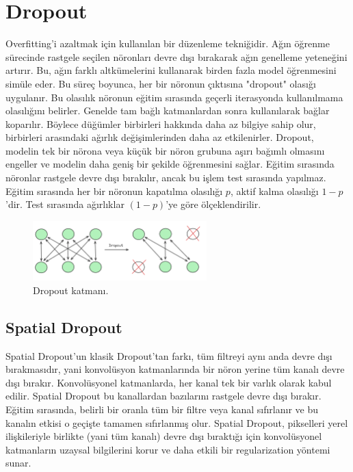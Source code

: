 \section{Dropout}
Overfitting'i azaltmak için kullanılan bir düzenleme tekniğidir. Ağın öğrenme sürecinde rastgele seçilen nöronları devre dışı bırakarak ağın genelleme yeteneğini artırır. Bu, ağın farklı altkümelerini kullanarak birden fazla model öğrenmesini simüle eder. Bu süreç boyunca, her bir nöronun çıktısına "dropout" olasığı uygulanır. Bu olasılık nöronun eğitim sırasında geçerli iterasyonda kullanılmama olasılığını belirler. Genelde tam bağlı katmanlardan sonra kullanılarak bağlar koparılır. Böylece düğümler birbirleri hakkında daha az bilgiye sahip olur, birbirleri arasındaki ağırlık değişimlerinden daha az etkilenirler. Dropout, modelin tek bir nörona veya küçük bir nöron grubuna aşırı bağımlı olmasını engeller ve modelin daha geniş bir şekilde öğrenmesini sağlar. Eğitim sırasında nöronlar rastgele devre dışı bırakılır, ancak bu işlem test sırasında yapılmaz. Eğitim sırasında her bir nöronun kapatılma olasılığı $p$, aktif kalma olasılığı $1 - p$'dir. Test sırasında ağırlıklar $(1 - p)$'ye göre ölçeklendirilir.

\begin{figure}[h]
    \centering
    \includegraphics[width=0.6\textwidth]{images/dropout_layer.png}
    \caption{Dropout katmanı.}
    \label{fig:enter-label}
\end{figure}

\subsection{Spatial Dropout}

Spatial Dropout'un klasik Dropout'tan farkı, tüm filtreyi aynı anda devre dışı bırakmasıdır, yani konvolüsyon katmanlarında bir nöron yerine tüm kanalı devre dışı bırakır. Konvolüsyonel katmanlarda, her kanal  tek bir varlık olarak kabul edilir. Spatial Dropout bu kanallardan bazılarını rastgele devre dışı bırakır. Eğitim sırasında, belirli bir oranla tüm bir filtre veya kanal sıfırlanır ve bu kanalın etkisi o geçişte tamamen sıfırlanmış olur. Spatial Dropout, pikselleri yerel ilişkileriyle birlikte (yani tüm kanalı) devre dışı bıraktığı için konvolüsyonel katmanların uzaysal bilgilerini korur ve daha etkili bir regularization yöntemi sunar.

